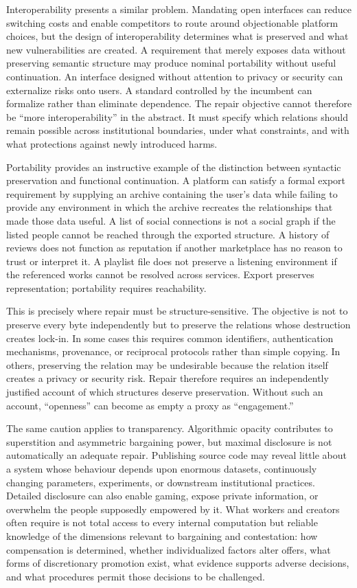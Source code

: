 \documentclass[11pt]{article}
\begin{document}
Interoperability presents a similar problem. Mandating open interfaces can reduce switching costs and enable competitors to route around objectionable platform choices, but the design of interoperability determines what is preserved and what new vulnerabilities are created. A requirement that merely exposes data without preserving semantic structure may produce nominal portability without useful continuation. An interface designed without attention to privacy or security can externalize risks onto users. A standard controlled by the incumbent can formalize rather than eliminate dependence. The repair objective cannot therefore be ``more interoperability'' in the abstract. It must specify which relations should remain possible across institutional boundaries, under what constraints, and with what protections against newly introduced harms.

Portability provides an instructive example of the distinction between syntactic preservation and functional continuation. A platform can satisfy a formal export requirement by supplying an archive containing the user's data while failing to provide any environment in which the archive recreates the relationships that made those data useful. A list of social connections is not a social graph if the listed people cannot be reached through the exported structure. A history of reviews does not function as reputation if another marketplace has no reason to trust or interpret it. A playlist file does not preserve a listening environment if the referenced works cannot be resolved across services. Export preserves representation; portability requires reachability.

This is precisely where repair must be structure-sensitive. The objective is not to preserve every byte independently but to preserve the relations whose destruction creates lock-in. In some cases this requires common identifiers, authentication mechanisms, provenance, or reciprocal protocols rather than simple copying. In others, preserving the relation may be undesirable because the relation itself creates a privacy or security risk. Repair therefore requires an independently justified account of which structures deserve preservation. Without such an account, ``openness'' can become as empty a proxy as ``engagement.''

The same caution applies to transparency. Algorithmic opacity contributes to superstition and asymmetric bargaining power, but maximal disclosure is not automatically an adequate repair. Publishing source code may reveal little about a system whose behaviour depends upon enormous datasets, continuously changing parameters, experiments, or downstream institutional practices. Detailed disclosure can also enable gaming, expose private information, or overwhelm the people supposedly empowered by it. What workers and creators often require is not total access to every internal computation but reliable knowledge of the dimensions relevant to bargaining and contestation: how compensation is determined, whether individualized factors alter offers, what forms of discretionary promotion exist, what evidence supports adverse decisions, and what procedures permit those decisions to be challenged.
\end{document}

